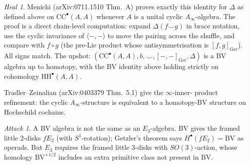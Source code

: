 \documentclass[11pt]{article}
\theoremstyle{definition}
\theoremstyle{remark}
\newtheorem*{attack}{Attack}
\newtheorem*{heal}{Heal}
\newcommand{\CC}{\mathrm{CC}}
\newcommand{\HH}{\mathrm{HH}}
\newcommand{\Ger}{\mathrm{Ger}}
\newcommand{\BV}{\mathrm{BV}}
\newcommand{\Ainf}{A_{\infty}}
\begin{document}
\begin{heal}
Menichi (arXiv:0711.1510 Thm.~A) proves exactly this identity for
$\Delta$ as defined above on $\CC^\bullet(A,A)$ whenever $A$ is a
unital cyclic $\Ainf$-algebra. The proof is a direct chain-level
computation: expand $\Delta(f \smile g)$ in brace notation, use the
cyclic invariance of $\langle-,-\rangle$ to move the pairing across
the shuffle, and compare with $f \circ g$ (the pre-Lie product whose
antisymmetrisation is $[f,g]_\Ger$). All signs match. The upshot:
$(\CC^\bullet(A,A), b, \smile, [-,-]_\Ger, \Delta)$ is a BV algebra
up to homotopy, with the BV identity above holding strictly on
cohomology $\HH^\bullet(A,A)$.

Tradler--Zeinalian (arXiv:0403379 Thm.~5.1) give the $\infty$-inner-
product refinement: the cyclic $\Ainf$-structure is equivalent to a
homotopy-BV structure on Hochschild cochains.
\end{heal}

\begin{attack}
A BV algebra is not the same as an $E_3$-algebra. BV gives the
framed little $2$-disks $fE_2$ (with $S^1$-rotation); Getzler's
theorem says $H^\bullet(fE_2) = \BV$ as operads. But $E_3$ requires
the framed little $3$-disks with $SO(3)$-action, whose homology
$\BV^{+1/2}$ includes an extra primitive class not present in
$\BV$.
\end{attack}
\end{document}
